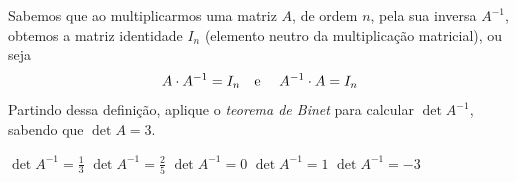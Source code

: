 Sabemos que ao multiplicarmos uma matriz $A$, de ordem $n$, pela sua inversa $A^{-1}$, obtemos a matriz identidade $I_n$ (elemento neutro da multiplicação matricial), ou seja
\[A\cdot A^{-1}=I_n\textnormal{\quad e \quad}A^{-1}\cdot A=I_n \]
Partindo dessa definição, aplique o {\it teorema de Binet} para calcular $\det A^{-1}$, sabendo que $\det A=3$.

$\det A^{-1}=\frac{1}{3}$
$\det A^{-1}=\frac{2}{5}$
$\det A^{-1}=0$
$\det A^{-1}=1$
$\det A^{-1}=-3$



